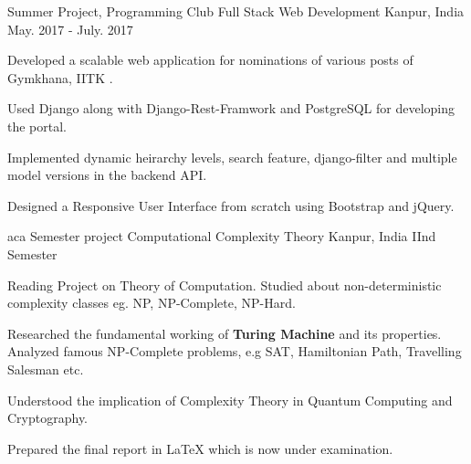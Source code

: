 \begin{cventries}
  \cventry
    {Summer Project, Programming Club}
    {Full Stack Web Development}
    {Kanpur, India}
    {May. 2017 - July. 2017}
    {
      \begin{cvitems}
          \item Developed a scalable web application for nominations of various posts of Gymkhana, IITK .
  \item Used Django along with Django-Rest-Framwork and PostgreSQL for developing the portal.  
  \item	Implemented dynamic heirarchy levels, search feature, django-filter and multiple model versions in the backend API.
  \item Designed a Responsive User Interface from scratch using Bootstrap and jQuery.
      \end{cvitems}
    }
  \cventry
    {aca Semester project}
    {Computational Complexity Theory}
    {Kanpur, India}
    {IInd Semester}
    {
      \begin{cvitems}
         \item Reading Project on Theory of Computation. Studied about non-deterministic complexity classes eg. NP, NP-Complete, NP-Hard.
  \item Researched the fundamental working of \textbf{Turing Machine} and its properties. Analyzed famous NP-Complete problems, e.g SAT, Hamiltonian Path, Travelling Salesman etc. 
  \item Understood the implication of Complexity Theory in Quantum Computing and Cryptography.
  \item Prepared the final report in \LaTeX{} which is now under examination. 
      \end{cvitems}
    }
\end{cventries}
